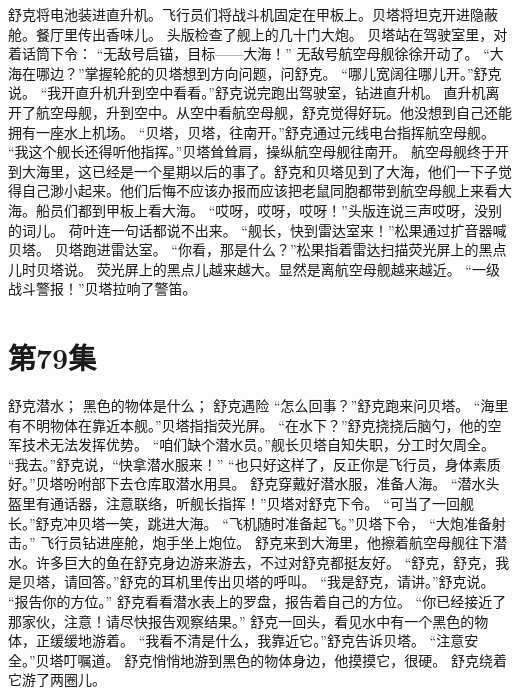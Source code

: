 \documentclass[a4paper,12pt,UTF8,twoside]{ctexbook}
\begin{document}
        舒克将电池装进直升机。飞行员们将战斗机固定在甲板上。贝塔将坦克开进隐蔽舱。餐厅里传出香味儿。 
        头版检查了舰上的几十门大炮。 
        贝塔站在驾驶室里，对着话筒下令： 
        “无敌号启锚，目标——大海！” 
        无敌号航空母舰徐徐开动了。 
        “大海在哪边？”掌握轮舵的贝塔想到方向问题，问舒克。 
        “哪儿宽阔往哪儿开。”舒克说。 
        “我开直升机升到空中看看。”舒克说完跑出驾驶室，钻进直升机。 
        直升机离开了航空母舰，升到空中。从空中看航空母舰，舒克觉得好玩。他没想到自己还能拥有一座水上机场。 
        “贝塔，贝塔，往南开。”舒克通过元线电台指挥航空母舰。 
        “我这个舰长还得听他指挥。”贝塔耸耸肩，操纵航空母舰往南开。 
        航空母舰终于开到大海里，这已经是一个星期以后的事了。舒克和贝塔见到了大海，他们一下子觉得自己渺小起来。他们后悔不应该办报而应该把老鼠同胞都带到航空母舰上来看大海。船员们都到甲板上看大海。 
        “哎呀，哎呀，哎呀！”头版连说三声哎呀，没别的词儿。 
        荷叶连一句话都说不出来。 
      “舰长，快到雷达室来！”松果通过扩音器喊贝塔。 
        贝塔跑进雷达室。 
        “你看，那是什么？”松果指着雷达扫描荧光屏上的黑点儿时贝塔说。 
        荧光屏上的黑点儿越来越大。显然是离航空母舰越来越近。 
        “一级战斗警报！”贝塔拉响了警笛。   \chapter{第79集} 
        舒克潜水； 
        黑色的物体是什么； 
        舒克遇险   
        “怎么回事？”舒克跑来问贝塔。 
        “海里有不明物体在靠近本舰。”贝塔指指荧光屏。 
        “在水下？”舒克挠挠后脑勺，他的空军技术无法发挥优势。 
        “咱们缺个潜水员。”舰长贝塔自知失职，分工时欠周全。 
        “我去。”舒克说，“快拿潜水服来！” 
        “也只好这样了，反正你是飞行员，身体素质好。”贝塔吩咐部下去仓库取潜水用具。 
        舒克穿戴好潜水服，准备人海。 
        “潜水头盔里有通话器，注意联络，听舰长指挥！”贝塔对舒克下令。 
        “可当了一回舰长。”舒克冲贝塔一笑，跳进大海。 
        “飞机随时准备起飞。”贝塔下令，  “大炮准备射击。” 
        飞行员钻进座舱，炮手坐上炮位。 
        舒克来到大海里，他擦着航空母舰往下潜水。许多巨大的鱼在舒克身边游来游去，不过对舒克都挺友好。 
        “舒克，舒克，我是贝塔，请回答。”舒克的耳机里传出贝塔的呼叫。 
        “我是舒克，请讲。”舒克说。 
        “报告你的方位。” 
        舒克看看潜水表上的罗盘，报告着自己的方位。 
        “你已经接近了那家伙，注意！请尽快报告观察结果。” 
        舒克一回头，看见水中有一个黑色的物体，正缓缓地游着。 
        “我看不清是什么，我靠近它。”舒克告诉贝塔。 
        “注意安全。”贝塔叮嘱道。 
        舒克悄悄地游到黑色的物体身边，他摸摸它，很硬。 
        舒克绕着它游了两圈儿。 
\end{document}

